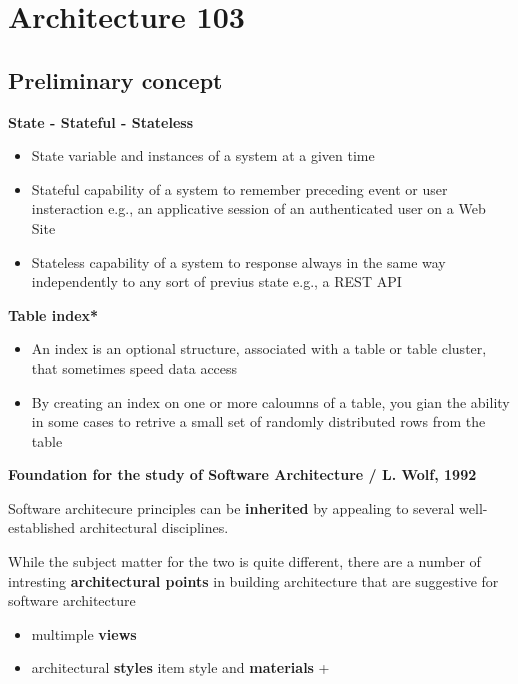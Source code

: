 \section{Architecture 103}

\subsection{Preliminary concept}

\textbf{State - Stateful - Stateless}

\begin{itemize}
	\item State
	variable and instances of a system at a given time
	\item Stateful
	capability of a system to remember preceding event or user insteraction
	e.g., an applicative session of an authenticated user on a Web Site
	\item Stateless
	capability of a system to response always in the same way independently to any sort of previus state
	e.g., a REST API
\end{itemize}

\textbf{Table index*}

\begin{itemize}
	\item An index is an optional structure, associated with a table or table cluster, that sometimes speed data access
	\item By creating an index on one or more caloumns of a table, you gian the ability in some cases to retrive a small set of randomly distributed rows from the table
\end{itemize}



\textbf{Foundation for the study of Software Architecture / L. Wolf, 1992}

Software architecure principles can be \textbf{inherited} by appealing to several well-established architectural disciplines.

While the subject matter for the two is quite different, there are a number of intresting \textbf{architectural points} in building architecture that are suggestive for software architecture
\begin{itemize}
	\item multimple \textbf{views}
	\item architectural \textbf{styles}
	item style and \textbf{materials}
+\end{itemize}

